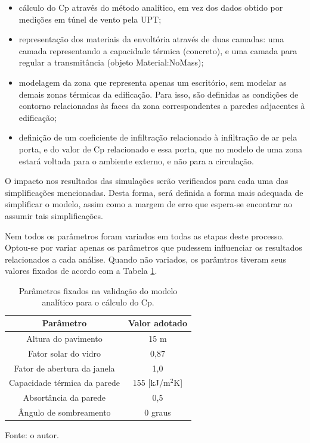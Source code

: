 \documentclass[brazil,hardcopy,openany,a5paper]{ufscthesis}
\begin{document}
		\begin{itemize}
		\item cálculo do Cp através do método analítico, em vez dos dados obtido por medições em túnel de vento pela UPT;
		\item representação dos materiais da envoltória através de duas camadas: uma camada representando a capacidade térmica (concreto), e uma camada para regular a transmitância (objeto Material:NoMass);
		\item modelagem da zona que representa apenas um escritório, sem modelar as demais zonas térmicas da edificação. Para isso, são definidas as condições de contorno relacionadas às faces da zona correspondentes a paredes adjacentes à edificação;
		\item definição de um coeficiente de infiltração relacionado à infiltração de ar pela porta, e do valor de Cp relacionado e essa porta, que no modelo de uma zona estará voltada para o ambiente externo, e não para a circulação.
		\end{itemize}
		
		O impacto nos resultados das simulações serão verificados para cada uma das simplificações mencionadas. Desta forma, será definida a forma mais adequada de simplificar o modelo, assim como a margem de erro que espera-se encontrar ao assumir tais simplificações.
		
		Nem todos os parâmetros foram variados em todas as etapas deste processo. Optou-se por variar apenas os parâmetros que pudessem influenciar os resultados relacionados a cada análise. Quando não variados, os parâmtros tiveram seus valores fixados de acordo com a Tabela \ref{table:paramfix}.
		
		\begin{table}[h]
			\centering
			\caption{Parâmetros fixados na validação do modelo analítico para o cálculo do Cp.}
			\label{table:paramfix}
			\begin{tabular}{|c |c |}
				\hline
				\textbf{Parâmetro} & \textbf{Valor adotado} \\
				\hline
				Altura do pavimento & 15 m \\
				\hline
				Fator solar do vidro & 0,87 \\
				\hline
				Fator de abertura da janela & 1,0 \\
				\hline
				Capacidade térmica da parede & 155 [kJ/m$^2$K] \\
				\hline
				Absortância da parede & 0,5 \\
				\hline 
				Ângulo de sombreamento & 0 graus \\
				\hline 
			\end{tabular}
			\begin{flushleft}
				Fonte: o autor.
			\end{flushleft}				
		\end{table}
		
\end{document}
